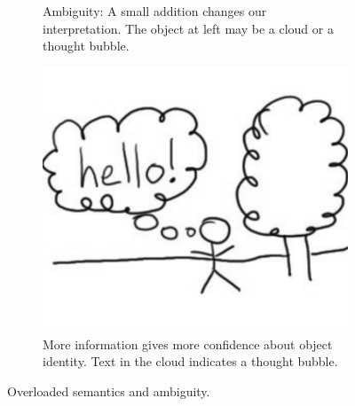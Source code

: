 \begin{figure}
\begin{subfigure}[b]{0.3\textwidth}
    \caption{Ambiguity: A small addition changes our
      interpretation. The object at left may be a cloud or a thought
      bubble.}
    \label{fig:cloud-2} 
  \end{subfigure}
  \hspace{0.03\linewidth}
  \begin{subfigure}[b]{0.3\textwidth}
    \centering
    \includegraphics[width=\textwidth]{img/cloud-3.pdf}  
    \caption{More information gives more confidence about object
      identity. Text in the cloud indicates a thought bubble.}
    \label{fig:cloud-3} 
  \end{subfigure}

  \caption[Overloaded Semantics and Ambiguity]{Overloaded semantics
    and ambiguity.}
  \label{fig:cloud}
\end{figure}
